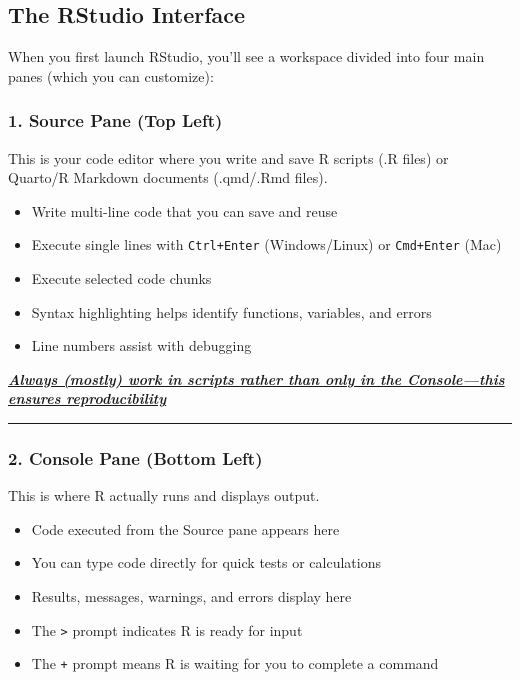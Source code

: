 \documentclass[
  letterpaper,
  DIV=11,
  numbers=noendperiod]{scrartcl}
\providecommand{\tightlist}{%
  \setlength{\itemsep}{0pt}\setlength{\parskip}{0pt}}
\begin{document}
\subsection{The RStudio Interface}\label{the-rstudio-interface}

When you first launch RStudio, you'll see a workspace divided into four
main panes (which you can customize):

\subsubsection{1. Source Pane (Top Left)}\label{source-pane-top-left}

This is your code editor where you write and save R scripts (.R files)
or Quarto/R Markdown documents (.qmd/.Rmd files).

\begin{itemize}
\tightlist
\item
  Write multi-line code that you can save and reuse
\item
  Execute single lines with \texttt{Ctrl+Enter} (Windows/Linux) or
  \texttt{Cmd+Enter} (Mac)
\item
  Execute selected code chunks
\item
  Syntax highlighting helps identify functions, variables, and errors
\item
  Line numbers assist with debugging
\end{itemize}

\ul{\textbf{\emph{Always (mostly) work in scripts rather than only in
the Console---this ensures reproducibility}}}

\begin{center}\rule{0.5\linewidth}{0.5pt}\end{center}

\subsubsection{2. Console Pane (Bottom
Left)}\label{console-pane-bottom-left}

This is where R actually runs and displays output.

\begin{itemize}
\tightlist
\item
  Code executed from the Source pane appears here
\item
  You can type code directly for quick tests or calculations
\item
  Results, messages, warnings, and errors display here
\item
  The \texttt{\textgreater{}} prompt indicates R is ready for input
\item
  The \texttt{+} prompt means R is waiting for you to complete a command
\end{itemize}
\end{document}
